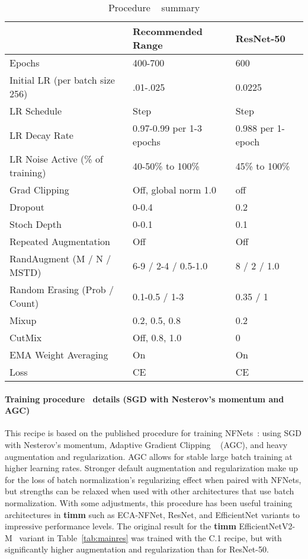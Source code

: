 \begin{table}[p]
\centering
\scalebox{0.85}
{\begin{tabular}{l|ll}
\toprule
 &  Recommended Range & ResNet-50 \\
 \midrule
 Epochs & 400-700 & 600 \\
 
 \midrule
 Initial LR (per batch size 256) & .01-.025 & 0.0225 \\
 LR Schedule & Step & Step \\
 LR Decay Rate & 0.97-0.99 per 1-3 epochs & 0.988 per 1-epoch \\
 LR Noise Active (\% of training) & 40-50\% to 100\% & 45\% to 100\% \\
 \midrule
 Grad Clipping & Off, global norm 1.0 & off \\
 \midrule
  Dropout & 0-0.4 & 0.2 \\ 
 Stoch Depth & 0-0.1 & 0.1 \\
 Repeated Augmentation & Off & Off \\
 \midrule
 RandAugment (M / N / MSTD) & 6-9 / 2-4 / 0.5-1.0 & 8 / 2 / 1.0 \\
 Random Erasing (Prob / Count) & 0.1-0.5 / 1-3 & 0.35 / 1 \\ 
  Mixup & 0.2, 0.5, 0.8 & 0.2 \\ 
 CutMix & Off, 0.8, 1.0 & 0 \\
 \midrule

 EMA Weight Averaging & On & On \\
 \midrule
 Loss & CE & CE \\ 

 \bottomrule
\end{tabular}}
\smallskip
\caption{Procedure \Bp~ summary 
\label{tab:procedure_b}}
\end{table}

\paragraph{Training procedure \Cp ~details (SGD with Nesterov's momentum and AGC)}

This recipe is based on the published procedure for training NFNets~\cite{Brock2021HighPerformanceLI}: using SGD with Nesterov’s momentum, Adaptive Gradient Clipping ~\cite{Brock2021HighPerformanceLI} (AGC), and heavy augmentation and regularization. AGC allows for stable large batch training at higher learning rates. Stronger default augmentation and regularization make up for the loss of batch normalization’s regularizing effect when paired with NFNets, but strengths can be relaxed when used with other architectures that use batch normalization. With some adjustments, this procedure has been useful training architectures in \textbf{timm} such as ECA-NFNet, ResNet, and EfficientNet variants to impressive performance levels. The original result for the \textbf{timm} EfficientNetV2-M~\cite{Tan2021EfficientNetV2SM} variant in Table~\ref{tab:mainres} was trained with the C.1 recipe, but with significantly higher augmentation and regularization than for ResNet-50.

